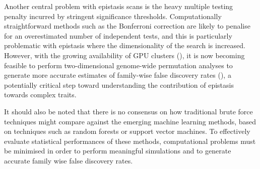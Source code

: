 Another central problem with epistasis scans is the heavy multiple testing penalty incurred by stringent significance thresholds. Computationally straightforward methods such as the Bonferroni correction are likely to penalise for an overestimated number of independent tests, and this is particularly problematic with epistasis where the dimensionality of the search is increased. However, with the growing availability of GPU clusters (\citealp{Fan:2004:GCH:1048933.1049991}), it is now becoming feasible to perform two-dimensional genome-wide permutation analyses to generate more accurate estimates of family-wise false discovery rates (\citealp{Churchill1994a}), a potentially critical step toward understanding the contribution of epistasis towards complex traits.

It should also be noted that there is no consensus on how traditional brute force techniques might compare against the emerging machine learning methods, based on techniques such as random forests or support vector machines. To effectively evaluate statistical performances of these methods, computational problems must be minimised in order to perform meaningful simulations and to generate accurate family wise false discovery rates.


